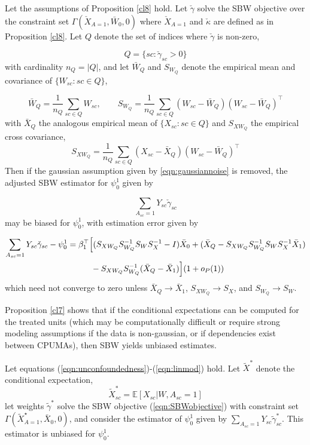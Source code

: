 \begin{proposition}\label{cl9}
Let the assumptions of Proposition \ref{cl8} hold. Let $\check{\gamma}$ solve the SBW objective over the constraint set $\Gamma(\check{X}_{A=1}, \bar{W}_0, 0)$ where $\check{X}_{A=1}$ and $\check{\kappa}$ are defined as in Proposition \ref{cl8}. Let $Q$ denote the set of indices where $\check{\gamma}$ is non-zero,

\[ Q = \{sc: \check{\gamma}_{sc} > 0\}\]
with cardinality $n_Q = |Q|$, and let $\bar{W}_Q$ and $S_{W_Q}$ denote the empirical mean and covariance of $\{W_{sc}:sc \in Q\}$,

\[ \bar{W}_Q = \frac{1}{n_Q}\sum_{sc \in Q} W_{sc},\qquad S_{W_Q} = \frac{1}{n_Q} \sum_{sc \in Q} (W_{sc} - \bar{W}_Q)(W_{sc} - \bar{W}_Q)^\top\]
with $\bar{X}_Q$ the analogous empirical mean of $\{X_{sc}:sc \in Q\}$ and $S_{XW_Q}$ the empirical cross covariance,
\[ S_{XW_Q} = \frac{1}{n_Q} \sum_{sc \in Q} (X_{sc} - \bar{X}_Q)(W_{sc} - \bar{W}_Q)^\top\]
Then if the gaussian assumption given by \eqref{eqn:gaussiannoise} is removed, the adjusted SBW estimator for $\psi_0^1$ given by 

\[\sum_{A_{sc}=1} Y_{sc} \check{\gamma}_{sc}\]
may be biased for $\psi_0^1$, with estimation error given by 

\begin{align} 
\nonumber \sum_{A_{sc}=1} Y_{sc} \check{\gamma}_{sc} - \psi_0^1 & = \beta_1^\top\Big[(S_{XW_Q}S_{W_Q}^{-1}S_WS_X^{-1} - I)\bar{X}_0  + (\bar{X}_Q - S_{XW_Q}S_{W_Q}^{-1} S_W S_X^{-1} \bar{X}_1) \\
& \hskip1cm {} - S_{XW_Q}S_{W_Q}^{-1}(\bar{X}_Q - \bar{X}_1)\Big](1 + o_P(1))  \label{eqn:cl9.error}
\end{align}
which need not converge to zero unless $\bar{X}_Q \to \bar{X}_1$, $S_{XW_Q} \to S_X$, and $S_{W_Q} \to S_W$.
\end{proposition}

Proposition \ref{cl7} shows that if the conditional expectations can be computed for the treated units (which may be computationally difficult or require strong modeling assumptions if the data is non-gaussian, or if dependencies exist between CPUMAs), then SBW yields unbiased estimates. 

\begin{proposition}\label{cl7}
    Let equations (\ref{eqn:unconfoundedness})-(\ref{eqn:linmod}) hold. Let $\tilde{X}^*$ denote the conditional expectation,
    \[\tilde{X}^*_{sc} = \mathbb{E}[X_{sc} | W, A_{sc}=1]\]
    let weights $\tilde{\gamma}^*$ solve the SBW objective (\ref{eqn:SBWobjective}) with constraint set $\Gamma(\tilde{X}^\star_{A=1}, \bar{X}_0, 0)$, and consider the estimator of $\psi_0^1$ given by $\sum_{A_{sc}=1} Y_{sc} \tilde{\gamma}^*_{sc}$. This estimator is unbiased for $\psi_0^1$.
\end{proposition}

